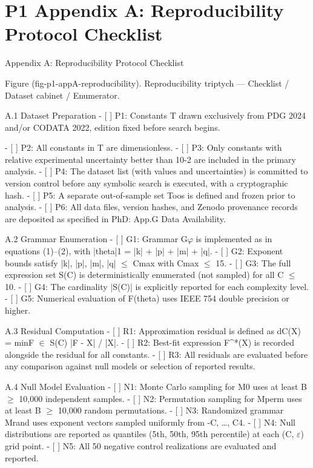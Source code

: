 
\section{P1 Appendix A: Reproducibility Protocol Checklist}

Appendix A: Reproducibility Protocol Checklist

        Figure (fig-p1-appA-reproducibility). Reproducibility triptych --- Checklist / Dataset cabinet /
                                                Enumerator.

  A.1 Dataset Preparation
  - [ ] P1: Constants T drawn exclusively from PDG 2024 and/or CODATA 2022, edition
  fixed before search begins.

  - [ ] P2: All constants in T are dimensionless.
  - [ ] P3: Only constants with relative experimental uncertainty better than 10-2 are
  included in the primary analysis.
  - [ ] P4: The dataset list (with values and uncertainties) is committed to version control
  before any symbolic search is executed, with a cryptographic hash.
  - [ ] P5: A separate out-of-sample set Toos is defined and frozen prior to analysis.
  - [ ] P6: All data files, version hashes, and Zenodo provenance records are deposited as
  specified in PhD: App.G Data Availability.

  A.2 Grammar Enumeration
  - [ ] G1: Grammar G$\varphi$ is implemented as in equations (1)--(2), with |theta|1 = |k| + |p| +
  |m| + |q|.
  - [ ] G2: Exponent bounds satisfy |k|, |p|, |m|, |q| $\leq$ Cmax with Cmax $\leq$ 15.
  - [ ] G3: The full expression set S(C) is deterministically enumerated (not sampled) for
  all C $\leq$ 10.
  - [ ] G4: The cardinality |S(C)| is explicitly reported for each complexity level.
  - [ ] G5: Numerical evaluation of F(theta) uses IEEE 754 double precision or higher.

  A.3 Residual Computation
  - [ ] R1: Approximation residual is defined as dC(X) = minF $\in$ S(C) |F - X| / |X|.
  - [ ] R2: Best-fit expression F\textasciicircum{}*(X) is recorded alongside the residual for all constants.
  - [ ] R3: All residuals are evaluated before any comparison against null models or
  selection of reported results.

  A.4 Null Model Evaluation
  - [ ] N1: Monte Carlo sampling for M0 uses at least B $\geq$ 10{,}000 independent samples.
  - [ ] N2: Permutation sampling for Mperm uses at least B $\geq$ 10{,}000 random
  permutations.
  - [ ] N3: Randomized grammar Mrand uses exponent vectors sampled uniformly from
  {-C, …, C}4.
  - [ ] N4: Null distributions are reported as quantiles (5th, 50th, 95th percentile) at each
  (C, $\varepsilon$) grid point.
  - [ ] N5: All 50 negative control realizations are evaluated and reported.


